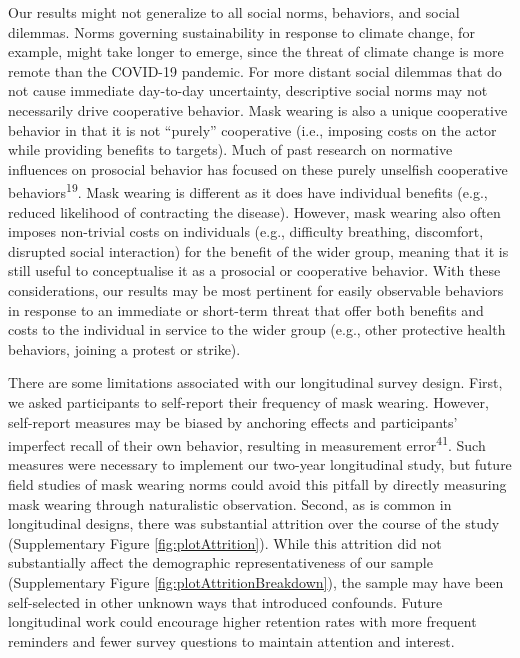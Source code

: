 \documentclass[
  man, donotrepeattitle,floatsintext]{apa6}
\begin{document}
Our results might not generalize to all social norms, behaviors, and social dilemmas. Norms governing sustainability in response to climate change, for example, might take longer to emerge, since the threat of climate change is more remote than the COVID-19 pandemic. For more distant social dilemmas that do not cause immediate day-to-day uncertainty, descriptive social norms may not necessarily drive cooperative behavior. Mask wearing is also a unique cooperative behavior in that it is not ``purely'' cooperative (i.e., imposing costs on the actor while providing benefits to targets). Much of past research on normative influences on prosocial behavior has focused on these purely unselfish cooperative behaviors\textsuperscript{19}. Mask wearing is different as it does have individual benefits (e.g., reduced likelihood of contracting the disease). However, mask wearing also often imposes non-trivial costs on individuals (e.g., difficulty breathing, discomfort, disrupted social interaction) for the benefit of the wider group, meaning that it is still useful to conceptualise it as a prosocial or cooperative behavior. With these considerations, our results may be most pertinent for easily observable behaviors in response to an immediate or short-term threat that offer both benefits and costs to the individual in service to the wider group (e.g., other protective health behaviors, joining a protest or strike).

There are some limitations associated with our longitudinal survey design. First, we asked participants to self-report their frequency of mask wearing. However, self-report measures may be biased by anchoring effects and participants' imperfect recall of their own behavior, resulting in measurement error\textsuperscript{41}. Such measures were necessary to implement our two-year longitudinal study, but future field studies of mask wearing norms could avoid this pitfall by directly measuring mask wearing through naturalistic observation. Second, as is common in longitudinal designs, there was substantial attrition over the course of the study (Supplementary Figure \ref{fig:plotAttrition}). While this attrition did not substantially affect the demographic representativeness of our sample (Supplementary Figure \ref{fig:plotAttritionBreakdown}), the sample may have been self-selected in other unknown ways that introduced confounds. Future longitudinal work could encourage higher retention rates with more frequent reminders and fewer survey questions to maintain attention and interest.
\end{document}
